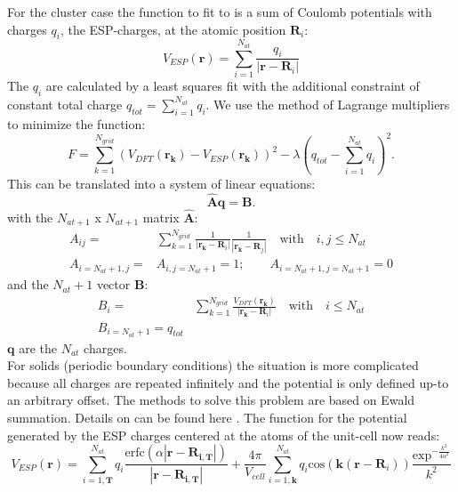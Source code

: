 \documentclass[12pt,a4paper,twoside,openany,titlepage,final]{book}
\begin{document}
For the cluster case the function to fit to is a sum of Coulomb potentials with charges $q_i$, the ESP-charges, 
at the atomic position $\mathbf{R}_i$:
\begin{equation}
 V_{ESP}(\mathbf{r})=\sum_{i=1}^{N_{at}}\frac{q_i}{|\mathbf{r}-\mathbf{R}_i|}
\end{equation}
The $q_i$ are calculated by a least squares fit with the additional constraint of constant total charge $q_{tot}=\sum_{i=1}^{N_{at}} q_i$. 
We use the method of Lagrange multipliers to minimize the function:
\begin{equation}
 F=\sum_{k=1}^{N_{grid}}\left(V_{DFT}(\mathbf{r_k})-V_{ESP}(\mathbf{r_k})\right)^2-\lambda\left(q_{tot}-\sum_{i=1}^{N_{at}}q_i\right)^2.\label{F_esp}
\end{equation}
This can be translated into a system of linear equations:
\begin{equation}
 \mathbf{\hat{A}}\mathbf{q}=\mathbf{B}.
\end{equation}
with the $N_{at+1}$ x $N_{at+1}$ matrix $\mathbf{\hat{A}}$:
\begin{align}
A_{ij}=&\sum_{k=1}^{N_{grid}}\frac{1}{|\mathbf{r_k}-\mathbf{R}_i|}\frac{1}{|\mathbf{r_k}-\mathbf{R}_j|}\quad \mathrm{with}\quad i,j\leq N_{at}\\
A_{i=N_{at}+1,j}=&A_{i,j=N_{at}+1}=1;\qquad A_{i=N_{at}+1,j=N_{at}+1}=0\nonumber
\end{align}
and the $N_{at}+1$ vector $\mathbf{B}$:
\begin{align}
 B_i=&\sum_{k=1}^{N_{grid}}\frac{V_{DFT}(\mathbf{r_k})}{|\mathbf{r_k}-\mathbf{R}_i|}\quad \mathrm{with}\quad i\leq N_{at}\\
 B_{i=N_{at}+1}=q_{tot}
\end{align}
$\mathbf{q}$ are the $N_{at}$ charges.\\
For solids (periodic boundary conditions) the situation is more complicated because all charges are repeated infinitely and the 
potential is only defined up-to an arbitrary offset. The methods to solve this problem are based on Ewald summation. 
Details on can be found here \cite{Chen2010}. The function for the potential 
generated by the ESP charges centered at the atoms of the unit-cell now reads:
\begin{equation}
 V_{ESP}(\mathbf{r})=\sum_{i=1,\mathbf{T}}^{N_{at}}q_i\frac{\mathrm{erfc}(\alpha|\mathbf{r}-\mathbf{R_{i,\mathbf{T}}}|)}{|\mathbf{r}-\mathbf{R_{i,\mathbf{T}}}|}+\frac{4\pi}{V_{cell}}\sum_{i=1,\mathbf{k}}^{N_{at}}q_i\mathrm{cos}(\mathbf{k}(\mathbf{r}-\mathbf{R}_{i}))\frac{\mathrm{exp}^{-\frac{k^2}{4\alpha^2}}}{k^2}\label{V_Ewald}
\end{equation}
\end{document}
